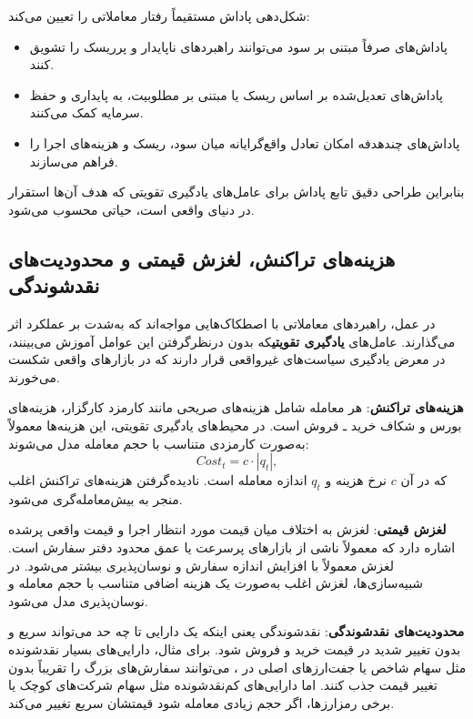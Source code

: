 \documentclass[12pt, a4paper]{report}
\begin{document}
\bigskip
شکل‌دهی پاداش مستقیماً رفتار معاملاتی را تعیین می‌کند:
\begin{itemize}
    \item پاداش‌های صرفاً مبتنی بر سود می‌توانند راهبردهای ناپایدار و پرریسک را تشویق کنند.  
    \item پاداش‌های تعدیل‌شده بر اساس ریسک یا مبتنی بر مطلوبیت، به پایداری و حفظ سرمایه کمک می‌کنند.  
    \item پاداش‌های چندهدفه امکان تعادل واقع‌گرایانه میان سود، ریسک و هزینه‌های اجرا را فراهم می‌سازند.  
\end{itemize}

بنابراین طراحی دقیق تابع پاداش برای عامل‌های یادگیری تقویتی که هدف آن‌ها استقرار در دنیای واقعی است، حیاتی محسوب می‌شود.  

\subsection{هزینه‌های تراکنش\protect{}، لغزش قیمتی\protect{} و محدودیت‌های نقدشوندگی\protect{}}\label{subsec:transaction-costs}

در عمل، راهبردهای معاملاتی با اصطکاک‌هایی مواجه‌اند که به‌شدت بر عملکرد اثر می‌گذارند. 
عامل‌های \textbf{یادگیری تقویتی}که بدون درنظرگرفتن این عوامل آموزش می‌بینند، 
در معرض یادگیری سیاست‌های غیرواقعی قرار دارند که در بازارهای واقعی شکست می‌خورند.  

\bigskip

\textbf{هزینه‌های تراکنش}:  
هر معامله شامل هزینه‌های صریحی مانند کارمزد کارگزار، هزینه‌های بورس و شکاف خرید ـ فروش  است. 
در محیط‌های یادگیری تقویتی، این هزینه‌ها معمولاً به‌صورت کارمزدی متناسب با حجم معامله مدل می‌شوند:
\[
Cost_t = c \cdot |q_t|,
\]
که در آن $c$ نرخ هزینه و $q_t$ اندازه معامله است. 
نادیده‌گرفتن هزینه‌های تراکنش اغلب منجر به بیش‌معامله‌گری می‌شود.  

\bigskip
\textbf{لغزش قیمتی}:  
لغزش به اختلاف میان قیمت مورد انتظار اجرا و قیمت واقعی پرشده اشاره دارد که معمولاً ناشی از 
بازارهای پرسرعت یا عمق محدود دفتر سفارش است. 
لغزش معمولاً با افزایش اندازه سفارش و نوسان‌پذیری بیشتر می‌شود.  
در شبیه‌سازی‌ها، لغزش اغلب به‌صورت یک هزینه اضافی متناسب با حجم معامله و نوسان‌پذیری مدل می‌شود.  

\bigskip
\textbf{محدودیت‌های نقدشوندگی}:  
نقدشوندگی یعنی اینکه یک دارایی تا چه حد می‌تواند سریع و بدون تغییر شدید در قیمت خرید و فروش شود.  
برای مثال، دارایی‌های بسیار نقدشونده مثل سهام شاخص  یا جفت‌ارزهای اصلی در ، 
می‌توانند سفارش‌های بزرگ را تقریباً بدون تغییر قیمت جذب کنند.  
اما دارایی‌های کم‌نقدشونده مثل سهام شرکت‌های کوچک یا برخی رمزارزها، اگر حجم زیادی معامله شود قیمتشان سریع تغییر می‌کند.  
\end{document}
